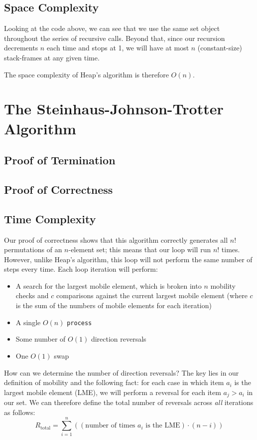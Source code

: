 \documentclass[10pt, oneside]{article}   	%
\begin{document}
\subsection{Space Complexity}

Looking at the code above, we can see that we use the same set object throughout the series of recursive calls. Beyond that, since our recursion decrements $n$ each time and stops at 1, we will have at most $n$ (constant-size) stack-frames at any given time.

The space complexity of Heap's algorithm is therefore $O(n)$.

\section{The Steinhaus-Johnson-Trotter Algorithm}

\newtheorem{axiom}{Axiom}[section]
\newtheorem{lemma}{Lemma}[section]

\subsection{Proof of Termination}

\subsection{Proof of Correctness}

\subsection{Time Complexity}

Our proof of correctness shows that this algorithm correctly generates all $n!$ permutations of an $n$-element set; this means that our loop will run $n!$ times. However, unlike Heap's algorithm, this loop will not perform the same number of steps every time. Each loop iteration will perform:
\begin{itemize}
	\item A search for the largest mobile element, which is broken into $n$ mobility checks and $c$ comparisons against the current largest mobile element (where $c$ is the sum of the numbers of mobile elements for each iteration)
	\item A single $O(n)$ \texttt{process}
	\item Some number of $O(1)$ direction reversals
	\item One $O(1)$ swap
\end{itemize}
How can we determine the number of direction reversals? The key lies in our definition of mobility and the following fact: for each case in which item $a_{i}$ is the largest mobile element (LME), we will perform a reversal for each item $a_{j} > a_{i}$ in our set. We can therefore define the total number of reversals across \emph{all} iterations as follows:
\[
	R_{\text{total}} = \sum_{i = 1}^{n} \left( (\text{number of times $a_{i}$ is the LME}) \cdot (n - i) \right)
\]
\end{document}
